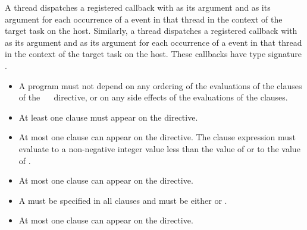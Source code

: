 A thread dispatches a registered  callback with
 as its  argument and
 as its  argument for each occurrence
of a  event in that thread in the context of the 
target task on the host. Similarly, a thread dispatches a registered 
 callback with  as its
 argument and  as its 
argument for each occurrence of a  event in that thread
in the context of the target task on the host. These callbacks have
type signature .

\restrictions
\begin{itemize}
\item A program must not depend on any ordering of the evaluations of the clauses 
      of the ~~ directive, or on any side 
      effects of the evaluations of the clauses.
\item At least one  clause must appear on the directive.
\item At most one  clause can appear on the directive. The 
       clause expression must evaluate to a non-negative integer 
      value less than the value of  or to the 
      value of .
\item At most one  clause can appear on the directive.
\item A  must be specified in all  clauses and must be 
      either  or .
\item At most one  clause can appear on the directive.
\end{itemize}

